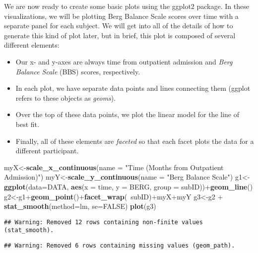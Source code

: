 \documentclass[]{article}
\newenvironment{Shaded}{\begin{snugshade}}{\end{snugshade}}
\newcommand{\KeywordTok}[1]{\textcolor[rgb]{0.13,0.29,0.53}{\textbf{{#1}}}}
\newcommand{\DataTypeTok}[1]{\textcolor[rgb]{0.13,0.29,0.53}{{#1}}}
\newcommand{\StringTok}[1]{\textcolor[rgb]{0.31,0.60,0.02}{{#1}}}
\newcommand{\OtherTok}[1]{\textcolor[rgb]{0.56,0.35,0.01}{{#1}}}
\newcommand{\NormalTok}[1]{{#1}}
\providecommand{\tightlist}{%
  \setlength{\itemsep}{0pt}\setlength{\parskip}{0pt}}
\begin{document}
We are now ready to create some basic plots using the ggplot2 package.
In these visualizations, we will be plotting Berg Balance Scale scores
over time with a separate panel for each subject. We will get into all
of the details of how to generate this kind of plot later, but in brief,
this plot is composed of several different elements:

\begin{itemize}
\tightlist
\item
  Our x- and y-axes are always time from outpatient admission and
  \emph{Berg Balance Scale} (BBS) scores, respectively.
\item
  In each plot, we have separate data points and lines connecting them
  (ggplot refers to these objects as \emph{geoms}).
\item
  Over the top of these data points, we plot the linear model for the
  line of best fit.
\item
  Finally, all of these elements are \emph{faceted} so that each facet
  plots the data for a different participant.
\end{itemize}

\begin{Shaded}
\begin{Highlighting}[]
\NormalTok{myX<-}\KeywordTok{scale_x_continuous}\NormalTok{(}\DataTypeTok{name =} \StringTok{"Time (Months from Outpatient Admission)"}\NormalTok{)}
\NormalTok{myY<-}\KeywordTok{scale_y_continuous}\NormalTok{(}\DataTypeTok{name =} \StringTok{"Berg Balance Scale"}\NormalTok{)}
\NormalTok{g1<-}\KeywordTok{ggplot}\NormalTok{(}\DataTypeTok{data=}\NormalTok{DATA, }\KeywordTok{aes}\NormalTok{(}\DataTypeTok{x =} \NormalTok{time, }\DataTypeTok{y =} \NormalTok{BERG, }\DataTypeTok{group =} \NormalTok{subID))+}\KeywordTok{geom_line}\NormalTok{()}
\NormalTok{g2<-g1+}\KeywordTok{geom_point}\NormalTok{()+}\KeywordTok{facet_wrap}\NormalTok{(~subID)+myX+myY}
\NormalTok{g3<-g2 +}\StringTok{ }\KeywordTok{stat_smooth}\NormalTok{(}\DataTypeTok{method=}\NormalTok{lm, }\DataTypeTok{se=}\OtherTok{FALSE}\NormalTok{)}
\KeywordTok{plot}\NormalTok{(g3)}
\end{Highlighting}
\end{Shaded}

\begin{verbatim}
## Warning: Removed 12 rows containing non-finite values (stat_smooth).
\end{verbatim}

\begin{verbatim}
## Warning: Removed 6 rows containing missing values (geom_path).
\end{verbatim}
\end{document}
